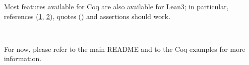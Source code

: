 \documentclass[a4paper]{article}
\begin{document}
Most features available for Coq are also available for Lean3; in particular, references (\hyperref[literate-lean3-lean-s-intro-h-0]{1}, \hyperref[literate-lean3-lean-s-and-intro-h-h-0]{2}), quotes () and assertions should work.

\begin{alectryon}
  ~~~~~~
\end{alectryon}

For now, please refer to the main README and to the Coq examples for more information.
\end{document}
